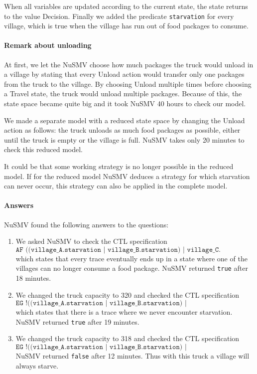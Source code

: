 \documentclass[12pt]{article}
\begin{document}
When all variables are updated according to the current state, 
the state returns to the value Decision.
Finally we added the predicate \texttt{starvation} for every village, which is true when the village has run out of food packages to consume.

\paragraph{Remark about unloading}
At first, we let the NuSMV choose how much packages the truck would unload in a village by stating that every Unload action would transfer only one packages from the truck to the village.
By choosing Unload multiple times before choosing a Travel state, the truck would unload multiple packages.
Because of this, the state space became quite big and it took NuSMV 40 hours to check our model.

We made a separate model with a reduced state space by changing the Unload action as follows:
the truck unloads as much food packages as possible, either until the truck is empty or the village is full.
NuSMV takes only 20 minutes to check this reduced model.

It could be that some working strategy is no longer possible in the reduced model.
If for the reduced model NuSMV deduces a strategy for which starvation can never occur, this strategy can also be applied in the complete model.

\paragraph{Answers} NuSMV found the following answers to the questions:
\begin{enumerate}
\item We asked NuSMV to check the CTL specification
\[ \texttt{AF ((village\_A.starvation | village\_B.starvation) | village\_C.
starvation)} \]
which states that every trace eventually ends up in a state where one of the villages can no longer consume a food package.
NuSMV returned \texttt{true} after 18 minutes.

\item We changed the truck capacity to 320 and checked the CTL specification
\[ \texttt{EG !((village\_A.starvation | village\_B.starvation) | village\_C.starvation)} \]
which states that there is a trace where we never encounter starvation.
NuSMV returned \texttt{true} after 19 minutes.

\item We changed the truck capacity to 318 and checked the CTL specification
\[\texttt{EG !((village\_A.starvation | village\_B.starvation) | village\_C.starvation)} \]
NuSMV returned \texttt{false} after 12 minutes.
Thus with this truck a village will always starve.
\end{enumerate}
\end{document}
